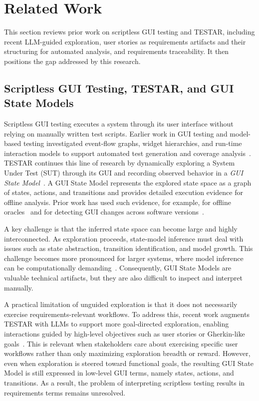 \section{Related Work}
\label{sec:related-work}

This section reviews prior work on scriptless GUI testing and TESTAR, including recent LLM-guided exploration, user stories as requirements artifacts and their structuring for automated analysis, and requirements traceability. It then positions the gap addressed by this research.

\subsection{Scriptless GUI Testing, TESTAR, and GUI State Models}
\label{subsec:scriptless-gui-models}

Scriptless GUI testing executes a system through its user interface without relying on manually written test scripts. Earlier work in GUI testing and model-based testing investigated event-flow graphs, widget hierarchies, and run-time interaction models to support automated test generation and coverage analysis~\citep{memon2007event}. TESTAR continues this line of research by dynamically exploring a System Under Test (SUT) through its GUI and recording observed behavior in a \emph{GUI State Model}~\citep{vos2021testar}. A GUI State Model represents the explored state space as a graph of states, actions, and transitions and provides detailed execution evidence for offline analysis. Prior work has used such evidence, for example, for offline oracles~\citep{de2019offline} and for detecting GUI changes across software versions~\citep{ricos2025delta}.

A key challenge is that the inferred state space can become large and highly interconnected. As exploration proceeds, state-model inference must deal with issues such as state abstraction, transition identification, and model growth. This challenge becomes more pronounced for larger systems, where model inference can be computationally demanding~\citep{mulders2022state,ricos2023distributed}. Consequently, GUI State Models are valuable technical artifacts, but they are also difficult to inspect and interpret manually.

A practical limitation of unguided exploration is that it does not necessarily exercise requirements-relevant workflows. To address this, recent work augments TESTAR with LLMs to support more goal-directed exploration, enabling interactions guided by high-level objectives such as user stories or Gherkin-like goals~\citep{van2025llm}. This is relevant when stakeholders care about exercising specific user workflows rather than only maximizing exploration breadth or reward. However, even when exploration is steered toward functional goals, the resulting GUI State Model is still expressed in low-level GUI terms, namely states, actions, and transitions. As a result, the problem of interpreting scriptless testing results in requirements terms remains unresolved.

